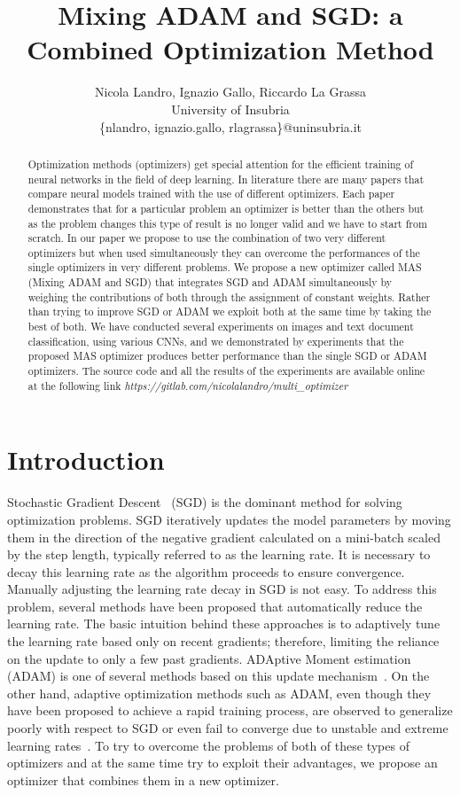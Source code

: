 \documentclass[10pt,twocolumn,letterpaper]{article}
\title{Mixing ADAM and SGD: a Combined Optimization Method}
\author{Nicola Landro, Ignazio Gallo, Riccardo La Grassa\\
University of Insubria\\
\{nlandro, ignazio.gallo, rlagrassa\}@uninsubria.it
}
\begin{document}
\date{}
\maketitle


\begin{abstract}
Optimization methods (optimizers) get special attention for the efficient training of neural networks in the field of deep learning. 
In literature there are many papers that compare neural models trained with the use of different optimizers. 
Each paper demonstrates that for a particular problem an optimizer is better than the others but as the problem changes this type of result is no longer valid and we have to start from scratch.
In our paper we propose to use the combination of two very different optimizers but when used simultaneously they can overcome the performances of the single optimizers in very different problems.
We propose a new optimizer called MAS (Mixing ADAM and SGD) that integrates SGD and ADAM simultaneously by weighing the contributions of both through the assignment of constant weights.
Rather than trying to improve SGD or ADAM we exploit both at the same time by taking the best of both.
We have conducted several experiments on images and text document classification, using various CNNs, and we demonstrated by experiments that the proposed MAS optimizer produces better performance than the single SGD or ADAM optimizers.
The source code and all the results of the experiments are available online at the following link \textit{{{https://gitlab.com/nicolalandro/multi\_optimizer}}}
\end{abstract}

\section{Introduction}
Stochastic Gradient Descent~\cite{robbins1951stochastic} (SGD) is the dominant method for solving optimization problems. 
SGD iteratively updates the model parameters by moving them in the direction of the negative gradient calculated on a mini-batch scaled by the step length, typically referred to as the learning rate. 
It is necessary to decay this learning rate as the algorithm proceeds to ensure convergence. Manually adjusting the learning rate decay in SGD is not easy. To address this problem, several methods have been proposed that automatically reduce the learning rate.
The basic intuition behind these approaches is to adaptively tune the learning rate based only on recent gradients; therefore, limiting the reliance on the update to only a few past gradients. 
ADAptive Moment estimation~\cite{kingma2014adam} (ADAM) is one of several methods based on this update mechanism~\cite{zaheer2018adaptive}.
On the other hand, adaptive optimization methods such as ADAM, even though they have been proposed to achieve a rapid training process, are observed to generalize poorly with respect to SGD or even fail to converge due to unstable and extreme learning rates~\cite{luo2019adaptive}.
To try to overcome the problems of both of these types of optimizers and at the same time try to exploit their advantages, we propose an optimizer that combines them in a new optimizer.
\end{document}
